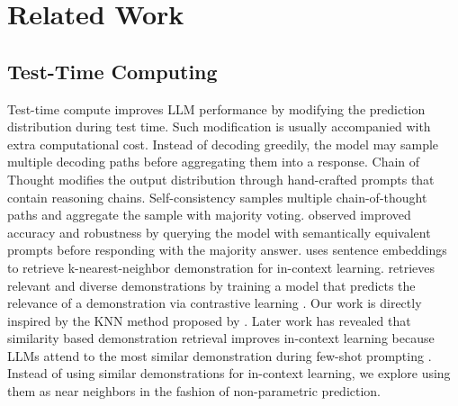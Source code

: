 \section{Related Work}
\subsection{Test-Time Computing}
Test-time compute \cite{test-time-compute} improves LLM performance by modifying the prediction distribution during test time. Such modification is usually accompanied with extra computational cost. Instead of decoding greedily, the model may sample multiple decoding paths before aggregating them into a response. Chain of Thought \cite{chain-of-thought} modifies the output distribution through hand-crafted prompts that contain reasoning chains. 
Self-consistency \cite{self-consistency} samples multiple chain-of-thought paths and aggregate the sample with majority voting. \cite{ensemble-of-prompt} observed improved accuracy and robustness by querying the model with semantically equivalent prompts before responding with the majority answer. 
\cite{TopK} uses sentence embeddings to retrieve k-nearest-neighbor demonstration for in-context learning. \cite{DPP} retrieves relevant and diverse demonstrations by training a model that predicts the relevance of a demonstration via contrastive learning \cite{SimCLR}. 
Our work is directly inspired by the KNN method proposed by \cite{TopK}. Later work has revealed that similarity based demonstration retrieval improves in-context learning because LLMs attend to the most similar demonstration during few-shot prompting \cite{anchor-words}. Instead of using similar demonstrations for in-context learning, we explore using them as near neighbors in the fashion of non-parametric prediction.


